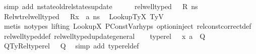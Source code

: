 \begin{isabellebody}
\ {\isacharparenleft}{\kern0pt}simp\ add{\isacharcolon}{\kern0pt}\ nstate{\isacharunderscore}{\kern0pt}old{\isacharunderscore}{\kern0pt}rel{\isacharunderscore}{\kern0pt}states{\isacharunderscore}{\kern0pt}update{\isacharparenright}{\kern0pt}\ \ \isanewline
\ \ \isamarkupfalse%
\ {\isacartoucheopen}rel{\isacharunderscore}{\kern0pt}well{\isacharunderscore}{\kern0pt}typed\ {\isasymLambda}\ {\isasymOmega}\ R\ ns{\isacartoucheclose}\ \isamarkupfalse%
\ Rel{\isacharunderscore}{\kern0pt}wt{\isacharcolon}{\kern0pt}{\isachardoublequoteopen}rel{\isacharunderscore}{\kern0pt}well{\isacharunderscore}{\kern0pt}typed\ {\isasymLambda}\ {\isasymOmega}\ {\isacharparenleft}{\kern0pt}R{\isacharparenleft}{\kern0pt}x{}\ {\isasymmapsto}\ a{\isacharparenright}{\kern0pt}{\isacharparenright}{\kern0pt}\ {\isacharquery}{\kern0pt}ns{\isacharprime}{\kern0pt}{\isachardoublequoteclose}\ \isamarkupfalse%
\ LookupTyX{}\ TyV\isanewline
\ \ \ \ \isamarkupfalse%
\ {\isacharparenleft}{\kern0pt}metis\ {\isacharparenleft}{\kern0pt}no{\isacharunderscore}{\kern0pt}types{\isacharcomma}{\kern0pt}\ lifting{\isacharparenright}{\kern0pt}\ LookupX{}{\isacharprime}{\kern0pt}\ PConstVar{\isachardot}{\kern0pt}hyps{\isacharparenleft}{\kern0pt}{}{\isacharparenright}{\kern0pt}\ option{\isachardot}{\kern0pt}inject\ rel{\isacharunderscore}{\kern0pt}const{\isacharunderscore}{\kern0pt}correct{\isacharunderscore}{\kern0pt}def\ rel{\isacharunderscore}{\kern0pt}well{\isacharunderscore}{\kern0pt}typed{\isacharunderscore}{\kern0pt}def\ rel{\isacharunderscore}{\kern0pt}well{\isacharunderscore}{\kern0pt}typed{\isacharunderscore}{\kern0pt}update{\isacharunderscore}{\kern0pt}general{\isacharparenright}{\kern0pt}\isanewline
\ \ \isamarkupfalse%
\ {\isacartoucheopen}type{\isacharunderscore}{\kern0pt}rel\ {\isasymLambda}\ {\isasymLambda}{\isacharprime}{\kern0pt}\ {\isacharparenleft}{\kern0pt}{\isacharparenleft}{\kern0pt}x{}{\isacharcomma}{\kern0pt}\ a{\isacharparenright}{\kern0pt}\ {\isacharhash}{\kern0pt}\ Q{\isacharparenright}{\kern0pt}{\isacartoucheclose}\ \isamarkupfalse%
\ QTyRel{\isacharcolon}{\kern0pt}{\isachardoublequoteopen}type{\isacharunderscore}{\kern0pt}rel\ {\isasymLambda}\ {\isasymLambda}{\isacharprime}{\kern0pt}\ Q{\isachardoublequoteclose}\ \isamarkupfalse%
\ {\isacharparenleft}{\kern0pt}simp\ add{\isacharcolon}{\kern0pt}\ type{\isacharunderscore}{\kern0pt}rel{\isacharunderscore}{\kern0pt}def{\isacharparenright}{\kern0pt}\isanewline

\end{isabellebody}
